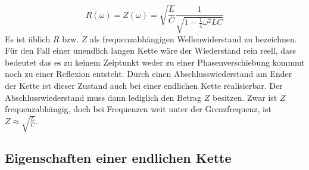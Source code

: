 \begin{equation}
R(\omega)=Z(\omega)=\sqrt{\frac{L}{C}}\frac{1}{\sqrt{1-\frac{1}{4}\omega^2LC}}
\end{equation}
Es ist üblich $R$ bzw. $Z$ als frequenzabhängigen Wellenwiderstand zu bezeichnen.
Für den Fall einer unendlich langen Kette wäre der Wiederstand rein reell, dass bedeutet 
das es zu keinem Zeiptunkt weder zu einer Phasenverschiebung kommmt noch zu einer Reflexion entsteht.
Durch einen Abschlusswiederstand am Ender der Kette ist dieser Zustand auch bei einer endlichen Kette 
realisierbar. Der Abschlusswiederstand muss dann lediglich den Betrag $Z$ besitzen.
Zwar ist $Z$ frequenzabhängig, doch bei Frequenzen weit unter der Grenzfrequenz, ist 
$Z\approx \sqrt{\frac{L}{C}}$.

\subsection{Eigenschaften einer endlichen Kette}
 
